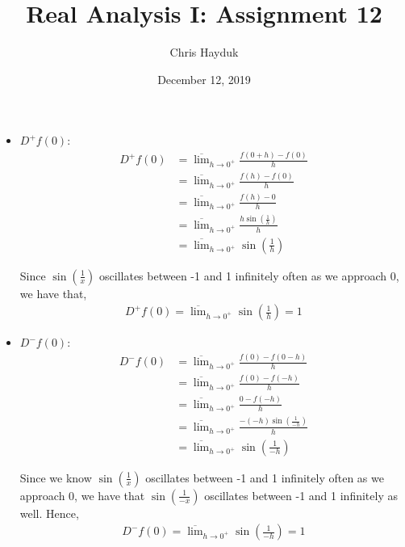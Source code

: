 \documentclass[12pt]{article}
\newenvironment{problem}[2][Problem]{\begin{trivlist}
\item[\hskip \labelsep {\bfseries #1}\hskip \labelsep {\bfseries #2.}]}{\end{trivlist}}
\begin{document}
\title{Real Analysis I: Assignment 12}

\author{Chris Hayduk}
\date{December 12, 2019}

\maketitle

\begin{problem}{1}
\end{problem}

\begin{itemize}

\item  $D^+f(0)$:
\begin{align*}
D^+f(0) &= \overline{\lim}_{h \to 0^+} \frac{f(0+h) - f(0)}{h}\\
&= \overline{\lim}_{h \to 0^+} \frac{f(h) - f(0)}{h}\\
&= \overline{\lim}_{h \to 0^+} \frac{f(h) - 0}{h}\\
&= \overline{\lim}_{h \to 0^+} \frac{h\sin(\frac{1}{h})}{h}\\
&= \overline{\lim}_{h \to 0^+} \sin\left(\frac{1}{h}\right)
\end{align*}

Since $\sin\left(\frac{1}{x}\right)$ oscillates between -1 and 1 infinitely often as we approach 0, we have that,
\begin{align*}
D^+f(0) = \overline{\lim}_{h \to 0^+} \sin\left(\frac{1}{h}\right) = 1
\end{align*}

\item $D^-f(0)$:
\begin{align*}
D^-f(0) &= \overline{\lim}_{h \to 0^+} \frac{f(0) - f(0-h)}{h}\\
&= \overline{\lim}_{h \to 0^+} \frac{f(0) - f(-h)}{h}\\
&= \overline{\lim}_{h \to 0^+} \frac{0 - f(-h)}{h}\\
&= \overline{\lim}_{h \to 0^+} \frac{-(-h)\sin(\frac{1}{-h})}{h}\\
&= \overline{\lim}_{h \to 0^+} \sin\left(\frac{1}{-h}\right)
\end{align*}

Since we know $\sin\left(\frac{1}{x}\right)$ oscillates between -1 and 1 infinitely often as we approach 0, we have that $\sin\left(\frac{1}{-x}\right)$ oscillates between -1 and 1 infinitely as well. Hence,
\begin{align*}
D^-f(0) = \overline{\lim}_{h \to 0^+} \sin\left(\frac{1}{-h}\right) = 1
\end{align*}


\end{itemize}
\end{document}
